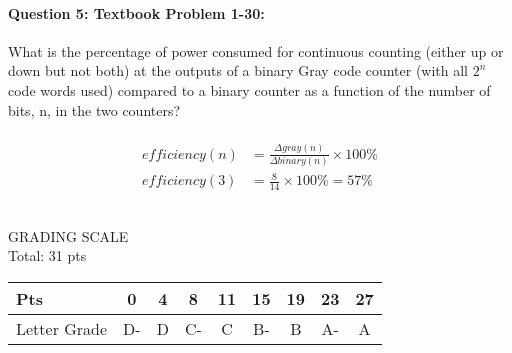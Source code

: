 \documentclass[12pt,letterpaper,notitlepage]{report}
\begin{document}
\paragraph{Question 5: Textbook Problem 1-30:}
What is the percentage of power consumed for continuous counting (either up or down but not both) at the outputs of a binary Gray code counter (with all $2^{n}$ code words used) compared to a binary counter as a function of the number of bits, n, in the two counters?

\begin{align*}
\\ efficiency(n)     &= \frac{\Delta gray(n)}{ \Delta binary(n)}\times 100\% 
\\ efficiency(3)     &= \frac{8}{14}\times 100\% = 57\%
\end{align*}
\\\bigskip

\noindent
GRADING SCALE\\\medskip
Total: 31 pts\bigskip
\begin{flushleft}
\def\arraystretch{1.5} 
\begin{tabular}{ | l | c | c | c | c | c | c | c | c | } \hline
Pts          & 0  & 4  & 8  & 11 & 15 & 19 & 23 & 27     \\\hline
Letter Grade & D- & D  & C- & C  & B- & B  & A- & A      \\\hline
\end{tabular}
\end{flushleft}
\end{document}
